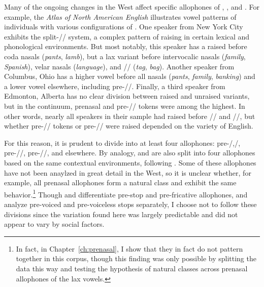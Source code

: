 Many of the ongoing changes in the West affect specific allophones of \trap, \dress, and \kit. For example, the \textit{Atlas of North American English} \citep[169--184]{labov_ash_boberg_2006_anae} illustrates vowel patterns of individuals with various configurations of \trap. One speaker from New York City exhibits the split-/\textipa{\ae}/ system, a complex pattern of raising in certain lexical and phonological environments. But most notably, this speaker has a raised \trap before coda nasals (\textit{pants}, \textit{lamb}), but a lax variant before intervocalic nasals (\textit{family}, \textit{Spanish}), velar nasals (\textit{language}), and // (\textit{tag}, \textit{bag}). Another speaker from Columbus, Ohio has a higher vowel before all nasals (\textit{pants}, \textit{family}, \textit{banking}) and a lower vowel elsewhere, including pre-//. Finally, a third speaker from Edmonton, Alberta has no clear division between raised and unraised variants, but in the continuum, prenasal and pre-// tokens were among the highest. In other words, nearly all speakers in their sample had raised \trap before // and //, but whether pre-// tokens or pre-// were raised depended on the variety of English.

For this reason, it is prudent to divide \trap into at least four allophones: pre-/,/, pre-//, pre-//, and elsewhere. By analogy, \dress and \kit are also split into four allophones based on the same contextual environments, following \citet{cardoso_etal_2016_pads}. Some of these allophones have not been anaylzed in great detail in the West, so it is unclear whether, for example, all prenasal allophones form a natural class and exhibit the same behavior.\footnote{In fact, in Chapter~\ref{ch:prenasal}, I show that they in fact do not pattern together in this corpus, though this finding was only possible by splitting the data this way and testing the hypothesis of natural classes across prenasal allophones of the lax vowels.} Though \citet{moonwomon_1991_diss} and \citet{swan_2016_proceedings} differentiate pre-stop and pre-fricative allophones, and \citep{labov_ash_boberg_2006_anae} analyze pre-voiced and pre-voiceless stops separately, I choose not to follow these divisions since the variation found here was largely predictable and did not appear to vary by social factors.




